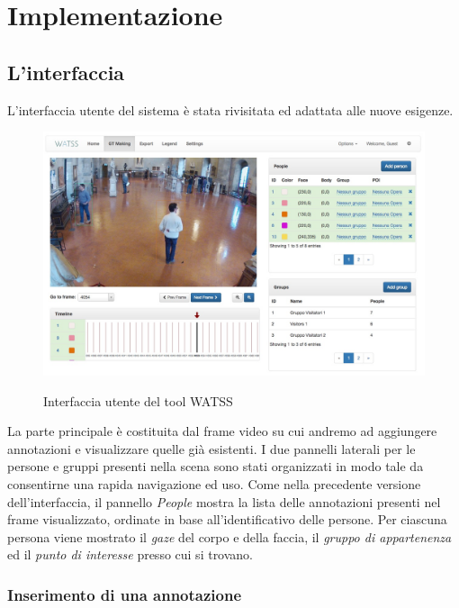 \section{Implementazione}

\subsection{L'interfaccia}

L'interfaccia utente del sistema è stata rivisitata ed adattata alle nuove esigenze. 

\begin{figure}
\begin{center}
\centering
\includegraphics[width=1\linewidth]{images/watss-gui.jpg}
  \label{fig:watss-gui}
  \caption{Interfaccia utente del tool WATSS}
\end{center}
\end{figure}

La parte principale è costituita dal frame video su cui andremo ad aggiungere annotazioni e visualizzare quelle già esistenti.
I due pannelli laterali per le persone e gruppi presenti nella scena sono stati organizzati in modo tale da consentirne una rapida navigazione ed uso. Come nella precedente versione dell'interfaccia, il pannello \emph{People} mostra la lista delle annotazioni presenti nel frame visualizzato, ordinate in base all'identificativo delle persone. Per ciascuna persona viene mostrato il \emph{gaze }del corpo e della faccia, il \emph{gruppo di appartenenza} ed il \emph{punto di interesse} presso cui si trovano. 

\subsubsection{Inserimento di una annotazione}

